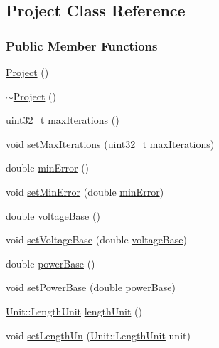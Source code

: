 \hypertarget{class_project}{}\subsection{Project Class Reference}
\label{class_project}
\subsubsection*{Public Member Functions}
\begin{DoxyCompactItemize}
\item 
\hyperlink{class_project_aa007ecd17d5bc800e7a956cf666eea21}{Project} ()
\item 
\hyperlink{class_project_ad165d61b76ee86ee9c27fd987a2a7b9e}{$\sim$\+Project} ()
\item 
uint32\+\_\+t \hyperlink{class_project_ab9d6426396a75f2fcaeadcddcd0fac64}{max\+Iterations} ()
\item 
void \hyperlink{class_project_af2046a5d542d3e3dd51cb9cb04604e8f}{set\+Max\+Iterations} (uint32\+\_\+t \hyperlink{class_project_ab9d6426396a75f2fcaeadcddcd0fac64}{max\+Iterations})
\item 
double \hyperlink{class_project_a457ed8d3b0ea5816f928977509f69a34}{min\+Error} ()
\item 
void \hyperlink{class_project_a2cb776c39adb42a1113bf7887d0d4636}{set\+Min\+Error} (double \hyperlink{class_project_a457ed8d3b0ea5816f928977509f69a34}{min\+Error})
\item 
double \hyperlink{class_project_a4e857ccb6162f57f5d72f4e7199e4573}{voltage\+Base} ()
\item 
void \hyperlink{class_project_a494c3e89851f754188c7abaedbf77ef6}{set\+Voltage\+Base} (double \hyperlink{class_project_a4e857ccb6162f57f5d72f4e7199e4573}{voltage\+Base})
\item 
double \hyperlink{class_project_a1a417c6832182389fb501b92cade3f9d}{power\+Base} ()
\item 
void \hyperlink{class_project_abb4df805b3cd3af509a41e657eb4bb83}{set\+Power\+Base} (double \hyperlink{class_project_a1a417c6832182389fb501b92cade3f9d}{power\+Base})
\item 
\hyperlink{class_unit_a8c8921f7b225ad6063b1cb573425b9a0}{Unit\+::\+Length\+Unit} \hyperlink{class_project_a40cd2f59a4a708897e5997942c046f4d}{length\+Unit} ()
\item 
void \hyperlink{class_project_a846ee2284b0856d461b35d78d9f8e1d6}{set\+Length\+Un} (\hyperlink{class_unit_a8c8921f7b225ad6063b1cb573425b9a0}{Unit\+::\+Length\+Unit} unit)

\end{DoxyCompactItemize}
